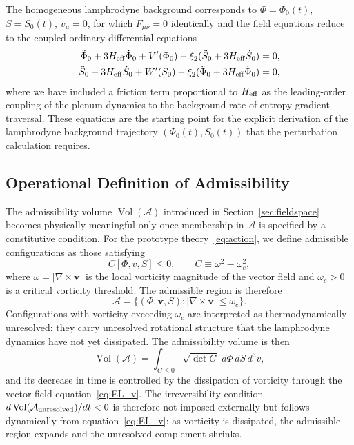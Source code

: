 \documentclass[12pt, a4paper]{article}
\newcommand{\calA}{\mathcal{A}}
\newcommand{\Heff}{H_{\rm eff}}
\newcommand{\Vol}{\operatorname{Vol}}
\begin{document}
The homogeneous lamphrodyne background corresponds to $\Phi = \Phi_0(t)$,
$S = S_0(t)$, $v_\mu = 0$, for which $F_{\mu\nu} = 0$ identically and the field
equations reduce to the coupled ordinary differential equations
\begin{align}
\ddot\Phi_0 + 3\Heff\dot\Phi_0 + V'(\Phi_0) - \xi_2(\ddot S_0 + 3\Heff\dot S_0)
&= 0, \\
\ddot S_0 + 3\Heff\dot S_0 + W'(S_0) - \xi_2(\ddot\Phi_0 + 3\Heff\dot\Phi_0)
&= 0,
\end{align}
where we have included a friction term proportional to $\Heff$ as the leading-order
coupling of the plenum dynamics to the background rate of entropy-gradient
traversal. These equations are the starting point for the explicit derivation of
the lamphrodyne background trajectory $(\Phi_0(t), S_0(t))$ that the perturbation
calculation requires.

\subsection{Operational Definition of Admissibility}
\label{sec:admissibility_operational}

The admissibility volume $\Vol(\calA)$ introduced in
Section~\ref{sec:fieldspace} becomes physically meaningful only once membership in
$\calA$ is specified by a constitutive condition. For the prototype
theory~\eqref{eq:action}, we define admissible configurations as those satisfying
\begin{equation}
C[\Phi, v, S] \leq 0, \qquad C \equiv \omega^2 - \omega_c^2,
\end{equation}
where $\omega = |\nabla \times \mathbf{v}|$ is the local vorticity magnitude of the
vector field and $\omega_c > 0$ is a critical vorticity threshold. The admissible
region is therefore
\begin{equation}
\calA = \bigl\{(\Phi, \mathbf{v}, S) : |\nabla \times \mathbf{v}| \leq \omega_c
\bigr\}.
\label{eq:admissible_set}
\end{equation}
Configurations with vorticity exceeding $\omega_c$ are interpreted as
thermodynamically unresolved: they carry unresolved rotational structure that the
lamphrodyne dynamics have not yet dissipated. The admissibility volume is then
\begin{equation}
\Vol(\calA) = \int_{C \leq 0} \sqrt{\det G}\; d\Phi\, dS\, d^3v,
\end{equation}
and its decrease in time is controlled by the dissipation of vorticity through the
vector field equation~\eqref{eq:EL_v}. The irreversibility condition
$d\Vol(\calA_{\rm unresolved})/dt < 0$ is therefore not imposed externally but
follows dynamically from equation~\eqref{eq:EL_v}: as vorticity is dissipated, the
admissible region expands and the unresolved complement shrinks.
\end{document}
